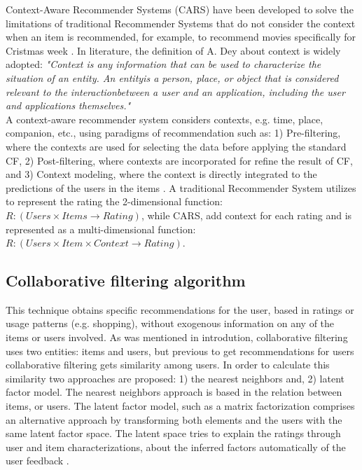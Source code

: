   Context-Aware Recommender Systems (CARS) have been developed to solve the
  limitations of traditional Recommender Systems that do not consider the
  context when an item is recommended, for example, to recommend movies
  specifically for Cristmas week \cite{abowd1999towards}. In literature, the
  definition of A. Dey \cite{fischer2012context} about context is widely
  adopted: \textit {"Context is any information that can be used to characterize
  the situation of an entity. An entityis a person, place, or object that is
  considered relevant to the interactionbetween a user and an application,
  including the user and applications themselves."} \\ A context-aware
  recommender system considers contexts, e.g. time, place, companion, etc.,
  using paradigms of recommendation \cite{adomavicius2011context}such as: 1)
  Pre-filtering, where the contexts are used for selecting the data before
  applying the standard CF, 2) Post-filtering, where contexts are incorporated
  for refine the result of CF, and 3) Context modeling, where the context is
  directly integrated to the predictions of the users in the items
  \cite{shani2008mining}. A traditional Recommender System utilizes to represent
  the rating the 2-dimensional function: ${R: (Users \times Items \rightarrow
  Rating)}$, while CARS, add context for  each rating and is represented as a
  multi-dimensional function: \\ ${ R:(Users \times Item \times Context
  \rightarrow Rating)}$.

  \subsection{Collaborative filtering algorithm} \label{sec:2.2}

  This technique obtains specific recommendations for the user, based in ratings
  or usage patterns (e.g. shopping), without exogenous information on any of the
  items or users involved.  As was mentioned in introdution, collaborative filtering uses two entities:
  items and users, but previous to get recommendations for users collaborative filtering gets
  similarity among users. In order to calculate this similarity two approaches
  are proposed: 1) the nearest neighbors and, 2) latent factor model. The
  nearest neighbors approach is based in the relation between items, or users.
  The latent factor model, such as a matrix factorization comprises an
  alternative approach by transforming both elements and the users with the same
  latent factor space. The latent space tries to explain the ratings through
  user and item characterizations, about the inferred factors automatically of
  the user feedback \cite{ricci2011introduction}.


